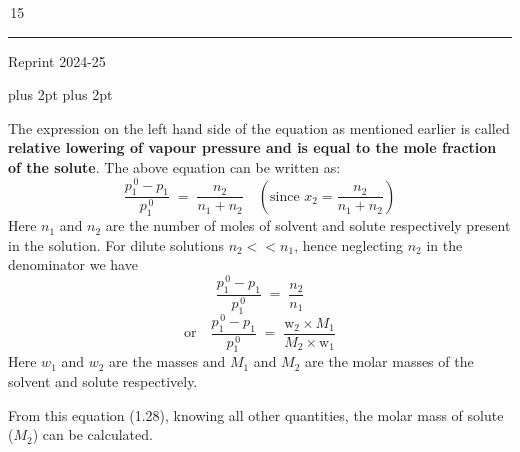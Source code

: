 \documentclass[11pt,a4paper]{article}
\renewcommand{\normalsize}{\fontsize{10.5bp}{12.7bp}\selectfont\abovedisplayskip=4pt plus 2pt\belowdisplayskip=4pt plus 2pt\abovedisplayshortskip=2pt\belowdisplayshortskip=2pt}
\begin{document}
\vfill
\noindent\hfill\begin{minipage}{0.33\textwidth}
\colorbox{Goldenrod1}{\color{gray}\,15\,}\\[-6pt]
{\color{Goldenrod1}\rule{\linewidth}{1pt}}
\end{minipage}
\begin{center}
{\sffamily\small Reprint 2024-25}
\end{center}

\normalsize


\noindent\hfill\begin{minipage}[t]{0.735\textwidth}
\hspace*{1.5em}The expression on the left hand side of the equation as mentioned earlier is called \textbf{relative lowering of vapour pressure and is equal to the mole fraction of the solute}. The above equation can be written as:
\[ \frac{p_1^{\,0} - p_1}{p_1^{\,0}} \;=\; \frac{n_2}{n_1 + n_2} \quad \left(\text{since } x_2 = \frac{n_2}{n_1 + n_2}\right) \tag{1.26} \]
\hspace*{1.5em}Here $n_1$ and $n_2$ are the number of moles of solvent and solute respectively present in the solution. For dilute solutions $n_2 << n_1$, hence neglecting $n_2$ in the denominator we have
\[ \frac{p_1^{\,0} - p_1}{p_1^{\,0}} \;=\; \frac{n_2}{n_1} \tag{1.27} \]
\[ \text{or}\quad \frac{p_1^{\,0} - p_1}{p_1^{\,0}} \;=\; \frac{\text{w}_2 \times M_1}{M_2 \times \text{w}_1} \tag{1.28} \]
\hspace*{1.5em}Here $w_1$ and $w_2$ are the masses and $M_1$ and $M_2$ are the molar masses of the solvent and solute respectively.

\hspace*{1.5em}From this equation (1.28), knowing all other quantities, the molar mass of solute ($M_2$) can be calculated.
\end{minipage}
\end{document}
